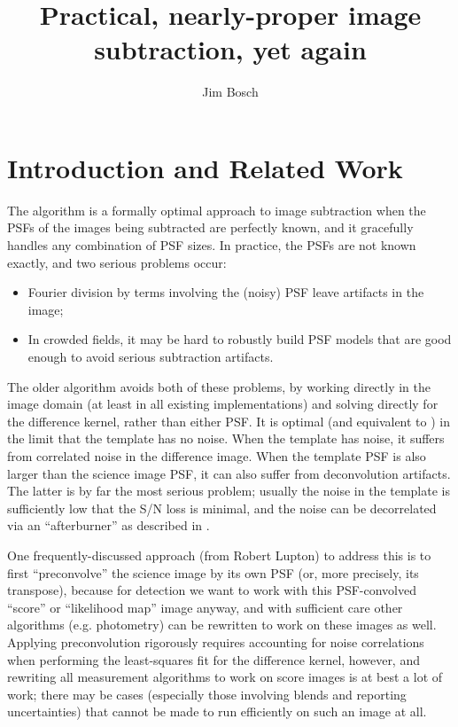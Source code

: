 \documentclass[DM,authoryear,toc]{lsstdoc}
\title{Practical, nearly-proper image subtraction, yet again}
\author{%
Jim Bosch
}
\date{\vcsDate}
\newcommand{\ZOGY}{\citetalias{2016ApJ...830...27Z}}
\newcommand{\AL}{\citetalias{1998ApJ...503..325A}}
\begin{document}
\mkshorttitle

\section{Introduction and Related Work}

The \ZOGY{} algorithm is a formally optimal approach to image subtraction when the PSFs of the images being subtracted are perfectly known, and it gracefully handles any combination of PSF sizes.
In practice, the PSFs are not known exactly, and two serious problems occur:
\begin{itemize}
  \item Fourier division by terms involving the (noisy) PSF leave artifacts in the image;
  \item In crowded fields, it may be hard to robustly build PSF models that are good enough to avoid serious subtraction artifacts.
\end{itemize}

The older \AL{} algorithm avoids both of these problems, by working directly in the image domain (at least in all existing implementations) and solving directly for the difference kernel, rather than either PSF.
It is optimal (and equivalent to \ZOGY{}) in the limit that the template has no noise.
When the template has noise, it suffers from correlated noise in the difference image.
When the template PSF is also larger than the science image PSF, it can also suffer from deconvolution artifacts.
The latter is by far the most serious problem; usually the noise in the template is sufficiently low that the S/N loss is minimal, and the noise can be decorrelated via an ``afterburner'' as described in .

One frequently-discussed approach (from Robert Lupton) to address this is to first ``preconvolve'' the science image by its own PSF (or, more precisely, its transpose), because for detection we want to work with this PSF-convolved ``score'' or ``likelihood map'' image anyway, and with sufficient care other algorithms (e.g. photometry) can be rewritten to work on these images as well.
Applying preconvolution rigorously requires accounting for noise correlations when performing the least-squares fit for the difference kernel, however, and rewriting all measurement algorithms to work on score images is at best a lot of work; there may be cases (especially those involving blends and reporting uncertainties) that cannot be made to run efficiently on such an image at all.
\end{document}
